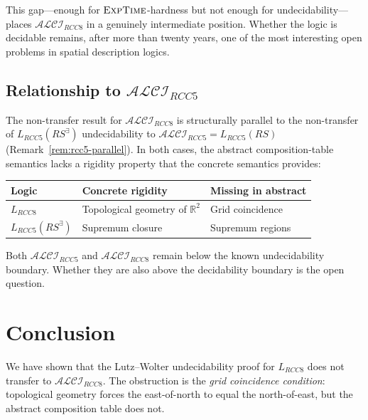 \documentclass[11pt]{article}
\newcommand{\ALCIRCC}[1]{\ensuremath{\mathcal{ALCI}_{\mathit{RCC#1}}}}
\newcommand{\LRCC}[1]{\ensuremath{L_{\mathit{RCC#1}}}}
\newcommand{\reals}{\mathbb{R}}
\newcommand{\EXPTIME}{\textsc{ExpTime}}
\newcommand{\RS}{\mathit{RS}}
\newcommand{\RSE}{\mathit{RS}^{\exists}}
\begin{document}
This gap---enough for $\EXPTIME$-hardness but not enough for
undecidability---places $\ALCIRCC{8}$ in a genuinely intermediate position.
Whether the logic is decidable remains, after more than twenty years, one of
the most interesting open problems in spatial description logics.

\subsection{Relationship to $\ALCIRCC{5}$}

The non-transfer result for $\ALCIRCC{8}$ is structurally parallel to the
non-transfer of $\LRCC{5}(\RSE)$ undecidability to $\ALCIRCC{5} = \LRCC{5}(\RS)$
(Remark~\ref{rem:rcc5-parallel}).  In both cases, the abstract
composition-table semantics lacks a rigidity property that the concrete
semantics provides:

\begin{center}
\begin{tabular}{@{}lll@{}}
  \toprule
  \textbf{Logic} & \textbf{Concrete rigidity} & \textbf{Missing in abstract} \\
  \midrule
  $\LRCC{8}$ & Topological geometry of $\reals^2$ & Grid coincidence \\
  $\LRCC{5}(\RSE)$ & Supremum closure & Supremum regions \\
  \bottomrule
\end{tabular}
\end{center}

Both $\ALCIRCC{5}$ and $\ALCIRCC{8}$ remain below the known undecidability
boundary.  Whether they are also above the decidability boundary is the
open question.

\section{Conclusion}

We have shown that the Lutz--Wolter undecidability proof for $\LRCC{8}$ does
not transfer to $\ALCIRCC{8}$.  The obstruction is the
\emph{grid coincidence condition}: topological geometry forces the east-of-north
to equal the north-of-east, but the abstract composition table does not.
\end{document}
